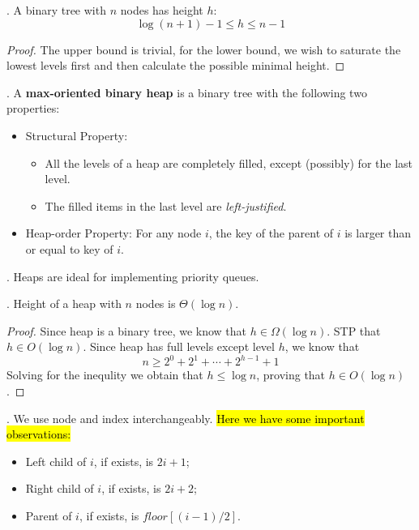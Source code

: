 \documentclass{article}
\begin{document}
\begin{thmm}[].
    A binary tree with $n$ nodes has height $h$: 
    \[ \log(n + 1) - 1 \leq h \leq n - 1 \]
\end{thmm}

\begin{proof}
    The upper bound is trivial, for the lower bound, we wish to saturate the lowest levels first and then calculate the possible minimal height. 
\end{proof}

\begin{deff}.
    A \textbf{max-oriented binary heap} is a binary tree with the following two properties: \begin{itemize}
        \item Structural Property: \begin{itemize}
            \item All the levels of a heap are completely filled, except (possibly) for the last level. 
            \item The filled items in the last level are \textit{left-justified}. 
        \end{itemize}
        \item Heap-order Property: For any node $i$, the key of the parent of $i$ is larger than or equal to key of $i$.
    \end{itemize}
\end{deff}

\begin{codes}[].
    Heaps are ideal for implementing priority queues. 
\end{codes}

\begin{lemm}[].
    Height of a heap with $n$ nodes is $\Theta(\log n)$. 
\end{lemm}

\begin{proof}
    Since heap is a binary tree, we know that $h \in \Omega(\log n)$. STP that $h \in O(\log n)$. Since heap has full levels except level $h$, we know that 
    \[ n \geq 2^0 + 2^1 + \cdots + 2^{h-1} + 1  \]
    Solving for the inequlity we obtain that $h \leq \log n$, proving that $h \in O(\log n)$. 
\end{proof}

\begin{result}[].
    We use node and index interchangeably. \hl{Here we have some important observations:} \begin{itemize}
        \item Left child of $i$, if exists, is $2i+1$; 
        \item Right child of $i$, if exists, is $2i+2$;  
        \item Parent of $i$, if exists, is $floor[(i-1) / 2]$. 
    \end{itemize}
\end{result}
\end{document}
